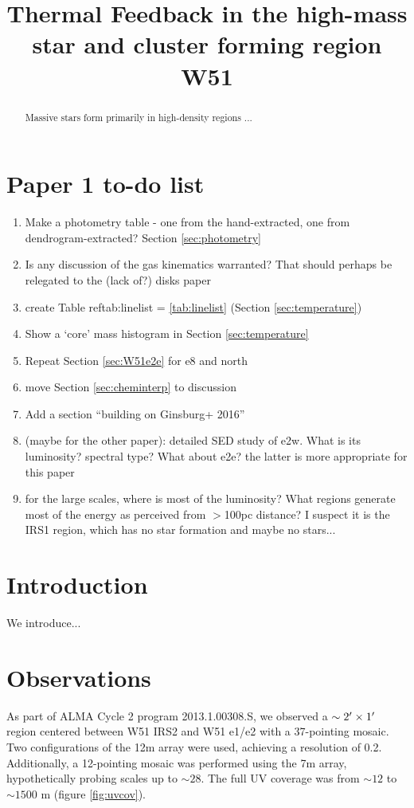 \documentclass{aa}
\begin{document}
\title{Thermal Feedback in the high-mass star and cluster forming region W51}

\begin{abstract}
    Massive stars form primarily in high-density regions ...
\end{abstract}

\section{Paper 1 to-do list}
\begin{enumerate}
    \item Make a photometry table - one from the hand-extracted, one from
        dendrogram-extracted?  Section \ref{sec:photometry}
    \item Is any discussion of the gas kinematics warranted?  That should
        perhaps be relegated to the (lack of?) disks paper
    \item create Table ref{tab:linelist} = \ref{tab:linelist} (Section
        \ref{sec:temperature})
    \item Show a `core' mass histogram in Section \ref{sec:temperature}
    \item Repeat Section \ref{sec:W51e2e} for e8 and north
    \item move Section \ref{sec:cheminterp} to discussion
    \item Add a section ``building on Ginsburg+ 2016''
    \item (maybe for the other paper): detailed SED study of e2w.  What is its
        luminosity?  spectral type?  What about e2e?  the latter is more appropriate
        for this paper
    \item for the large scales, where is most of the luminosity?  What regions
        generate most of the energy as perceived from $>$100pc distance?  I suspect
        it is the IRS1 region, which has no star formation and maybe no stars...

\end{enumerate}

\section{Introduction}
We introduce...

\section{Observations}
As part of ALMA Cycle 2 program 2013.1.00308.S, we observed a
$\sim2\mbox{$^\prime$}\times1\mbox{$^\prime$}$ region centered between W51 IRS2 and W51 e1/e2
with a 37-pointing mosaic.  Two configurations of the 12m array were used,
achieving a resolution of 0.2\arcsec.  Additionally, a 12-pointing mosaic was
performed using the 7m array, hypothetically probing scales up to
$\sim28$\arcsec.  The full UV coverage was from $\sim12$ to $\sim1500$ m
(figure \ref{fig:uvcov}).
\end{document}
